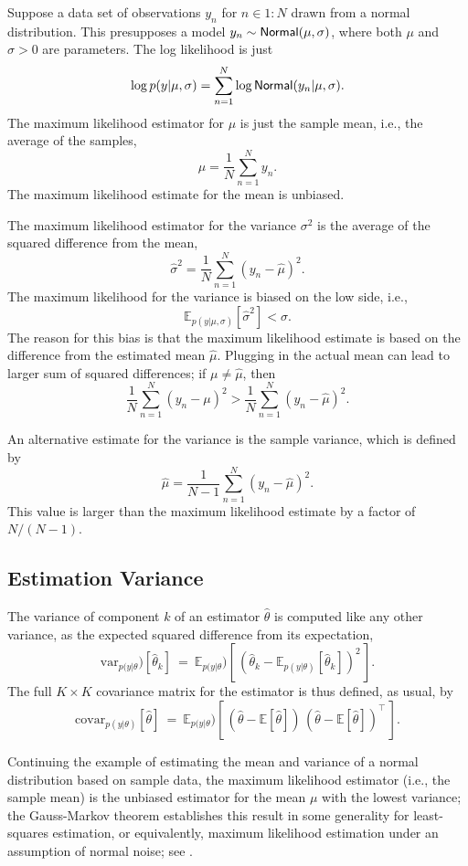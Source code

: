 Suppose a data set of observations $y_n$ for $n \in 1{:}N$ drawn from
a normal distribution.  This presupposes a model $y_n \sim
\distro{Normal}(\mu,\sigma)$, where both $\mu$ and $\sigma > 0$ are
parameters.  The log likelihood is just
\[
\log p(y|\mu,\sigma) = \sum_{n=1}^N \log
\distro{Normal}(y_n|\mu,\sigma).
\]
The maximum likelihood estimator for $\mu$ is just the sample mean,
i.e., the average of the samples,
\[
\hat{\mu} = \frac{1}{N} \sum_{n=1}^N y_n.
\]
The maximum likelihood estimate for the mean is unbiased.

The maximum likelihood estimator for the variance $\sigma^2$ is the
average of the squared difference from the mean,
\[
\hat{\sigma}^2 = \frac{1}{N} \sum_{n=1}^N (y_n - \hat{\mu})^2.
\]
The maximum likelihood for the variance is biased on the low side,
i.e., 
%
\[
\mathbb{E}_{p(y|\mu,\sigma)}[\hat{\sigma}^2] < \sigma.
\]
%
The reason for this bias is that the maximum likelihood estimate is
based on the difference from the estimated mean $\hat{\mu}$.  Plugging
in the actual mean can lead to larger sum of squared differences;  if
$\mu \neq \hat{\mu}$, then
\[
\frac{1}{N} \sum_{n=1}^N (y_n - \mu)^2
> 
\frac{1}{N} \sum_{n=1}^N (y_n - \hat{\mu})^2.
\]

An alternative estimate for the variance is the sample variance, which
is defined by
\[
\hat{\mu} = \frac{1}{N-1} \sum_{n=1}^N (y_n - \hat{\mu})^2.
\]
This value is larger than the maximum likelihood estimate by a factor
of $N/(N-1)$.


\subsection{Estimation Variance}

The variance of component $k$ of an estimator $\hat{\theta}$ is
computed like any other variance, as the expected squared difference
from its expectation, 
%
\[
\mbox{var}_{p(y|\theta})[\hat{\theta}_k]
\ = \
\mathbb{E}_{p(y|\theta})[\, (\hat{\theta}_k -
\mathbb{E}_{p(y|\theta)}[\hat{\theta}_k])^2 \,].
\]
%
The full $K \times K$ covariance matrix for the estimator is thus
defined, as usual, by
%
\[
\mbox{covar}_{p(y|\theta)}[\hat{\theta}]
\ = \
\mathbb{E}_{p(y|\theta})[\, (\hat{\theta} - \mathbb{E}[\hat{\theta}]) \,
                         (\hat{\theta} -
                         \mathbb{E}[\hat{\theta}])^{\top} \, ].
\]

Continuing the example of estimating the mean and variance of a normal
distribution based on sample data, the maximum likelihood estimator
(i.e., the sample mean) is the unbiased estimator for the mean $\mu$
with the lowest variance; the Gauss-Markov theorem establishes this
result in some generality for least-squares estimation, or
equivalently, maximum likelihood estimation under an assumption of
normal noise; see \citep[Section~3.2.2]{HastieTibshiraniFriedman:2009}.











